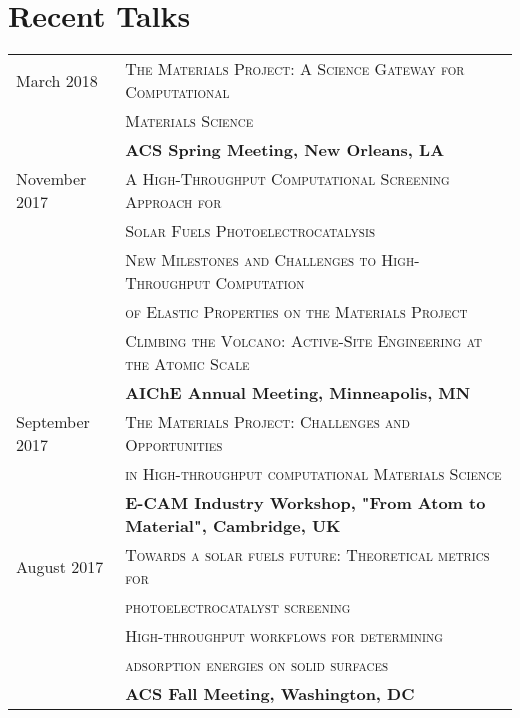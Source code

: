 \documentclass[a4paper,10pt]{article}
\begin{document}
\section{Recent Talks}
\begin{tabular}{ll}
March 2018 & \textsc{The Materials Project: A Science Gateway for Computational}\\
& \textsc{Materials Science} \vspace{0.04in} \\
& \textbf{ACS Spring Meeting, New Orleans, LA} \vspace{0.1in} \\
November 2017 & \textsc{A High-Throughput Computational Screening Approach for}\\
& \textsc{Solar Fuels Photoelectrocatalysis} \vspace{0.02in} \\
&  \textsc{New Milestones and Challenges to High-Throughput Computation} \\ 
& \textsc{of Elastic Properties on the Materials Project} \vspace{0.02in} \\
& \textsc{Climbing the Volcano: Active-Site Engineering at the Atomic Scale} \vspace{0.04in}\\
& \textbf{AIChE Annual Meeting, Minneapolis, MN} \vspace{0.1in} \\
September 2017 & \textsc{The Materials Project: Challenges and Opportunities}\\
& \textsc{in High-throughput computational Materials Science} \vspace{0.04in} \\
& \textbf{E-CAM Industry Workshop, "From Atom to Material", Cambridge, UK} \vspace{0.1in} \\
August 2017 & \textsc{Towards a solar fuels future: Theoretical metrics for} \\
& \textsc{photoelectrocatalyst screening} \vspace{0.02in} \\
& \textsc{High-throughput workflows for determining} \\
& \textsc{adsorption energies on solid surfaces} \vspace{0.04in} \\
& \textbf{ACS Fall Meeting, Washington, DC} \vspace{0.1in} \\

\end{tabular}
\end{document}
